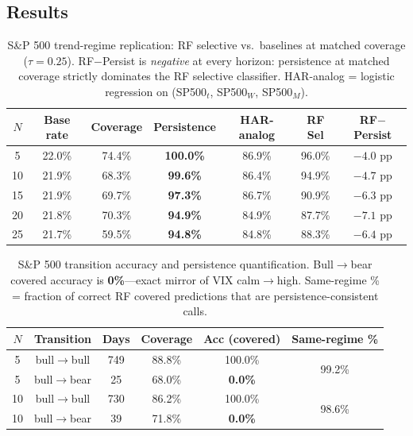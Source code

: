\documentclass[12pt]{article}
\begin{document}
\subsection{Results}

\begin{table}[H]
\centering
\caption{S\&P 500 trend-regime replication: RF selective vs.\ baselines at matched coverage ($\tau = 0.25$). RF$-$Persist is \emph{negative} at every horizon: persistence at matched coverage strictly dominates the RF selective classifier. HAR-analog = logistic regression on (SP500$_t$, SP500$_{W}$, SP500$_{M}$).}
\label{tab:sp500}
\begin{tabular}{ccccccc}
\toprule
$N$ & Base rate & Coverage & Persistence & HAR-analog & RF Sel & RF$-$Persist \\
\midrule
5  & 22.0\% & 74.4\% & \textbf{100.0\%} & 86.9\% & 96.0\% & $-4.0$ pp \\
10 & 21.9\% & 68.3\% & \textbf{99.6\%}  & 86.4\% & 94.9\% & $-4.7$ pp \\
15 & 21.9\% & 69.7\% & \textbf{97.3\%}  & 86.7\% & 90.9\% & $-6.3$ pp \\
20 & 21.8\% & 70.3\% & \textbf{94.9\%}  & 84.9\% & 87.7\% & $-7.1$ pp \\
25 & 21.7\% & 59.5\% & \textbf{94.8\%}  & 84.8\% & 88.3\% & $-6.4$ pp \\
\bottomrule
\end{tabular}
\end{table}

\begin{table}[H]
\centering
\caption{S\&P 500 transition accuracy and persistence quantification. Bull$\to$bear covered accuracy is \textbf{0\%}---exact mirror of VIX calm$\to$high. Same-regime \% = fraction of correct RF covered predictions that are persistence-consistent calls.}
\label{tab:sp500_trans}
\begin{tabular}{cccccc}
\toprule
$N$ & Transition & Days & Coverage & Acc (covered) & Same-regime \% \\
\midrule
5  & bull$\to$bull &  749 & 88.8\% & 100.0\% & \multirow{2}{*}{99.2\%} \\
5  & bull$\to$bear &   25 & 68.0\% & \textbf{0.0\%} & \\
\midrule
10 & bull$\to$bull &  730 & 86.2\% & 100.0\% & \multirow{2}{*}{98.6\%} \\
10 & bull$\to$bear &   39 & 71.8\% & \textbf{0.0\%} & \\
\bottomrule
\end{tabular}
\end{table}
\end{document}
